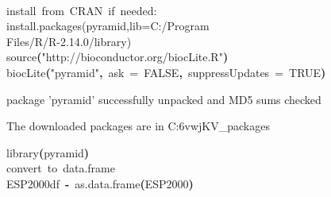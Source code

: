 \documentclass[a4paper]{article}
\newcommand{\hlnumber}[1]{\textcolor[rgb]{0.0823529411764706,0.0784313725490196,0.709803921568627}{#1}}%
\newcommand{\hlfunctioncall}[1]{\textcolor[rgb]{1,0,0}{#1}}%
\newcommand{\hlstring}[1]{\textcolor[rgb]{0.6,0.6,1}{#1}}%
\newcommand{\hlkeyword}[1]{\textcolor[rgb]{0,0,0}{\textbf{#1}}}%
\newcommand{\hlargument}[1]{\textcolor[rgb]{0.694117647058824,0.247058823529412,0.0196078431372549}{#1}}%
\newcommand{\hlcomment}[1]{\textcolor[rgb]{0.8,0.8,0.8}{#1}}%
\newcommand{\hlassignement}[1]{\textcolor[rgb]{0.215686274509804,0.215686274509804,0.384313725490196}{\textbf{#1}}}%
\newcommand{\hlsymbol}[1]{\textcolor[rgb]{0,0,0}{#1}}%
\newcommand{\hlprompt}[1]{\textcolor[rgb]{0,0,0}{#1}}%
\newcommand{\hlstd}[1]{\textcolor[rgb]{0,0,0}{#1}}%
\newenvironment{Houtput}{\raggedright}{%
%
}
\renewenvironment{Schunk}{\vspace{\topsep}}{\vspace{\topsep}}
\begin{document}
\begin{Houtput}
\hspace*{\fill}\\
\hlstd{}\ttfamily\noindent
\hlprompt{\usebox{\hlnormalsizeboxgreaterthan}{\ }}\hlcomment{\usebox{\hlnormalsizeboxhash}{\ }install{\ }from{\ }CRAN{\ }if{\ }needed:}\mbox{}
\normalfont
\hspace*{\fill}\\
\hlstd{}\ttfamily\noindent
\hlprompt{\usebox{\hlnormalsizeboxgreaterthan}{\ }}\hlcomment{\usebox{\hlnormalsizeboxhash}install.packages(\usebox{\hlnormalsizeboxsinglequote}pyramid\usebox{\hlnormalsizeboxsinglequote},lib=\usebox{\hlnormalsizeboxsinglequote}C:/Program}\mbox{}
\normalfont
\hspace*{\fill}\\
\hlstd{}\ttfamily\noindent
\hlprompt{\usebox{\hlnormalsizeboxgreaterthan}{\ }}\hlcomment{\usebox{\hlnormalsizeboxhash}{\ }{\ }{\ }Files/R/R-2.14.0/library\usebox{\hlnormalsizeboxsinglequote})}\mbox{}
\normalfont
\hspace*{\fill}\\
\hlstd{}\ttfamily\noindent
\hlprompt{\usebox{\hlnormalsizeboxgreaterthan}{\ }}\hlfunctioncall{source}\hlkeyword{(}\hlstring{"http://bioconductor.org/biocLite.R"}\hlkeyword{)}\mbox{}
\normalfont
\hspace*{\fill}\\
\hlstd{}\ttfamily\noindent
\hlprompt{\usebox{\hlnormalsizeboxgreaterthan}{\ }}\hlfunctioncall{biocLite}\hlkeyword{(}\hlstring{"pyramid"}\hlkeyword{,}{\ }\hlargument{ask}{\ }\hlargument{=}{\ }\hlnumber{FALSE}\hlkeyword{,}{\ }\hlargument{suppressUpdates}{\ }\hlargument{=}{\ }\hlnumber{TRUE}\hlkeyword{)}\mbox{}
\normalfont
\hspace*{\fill}\\
\hlstd{}\begin{Schunk}
\begin{Soutput}
package 'pyramid' successfully unpacked and MD5 sums checked

The downloaded packages are in
	C:\Users\triffe\AppData\Local\Temp\Rtmp6vwjKV\downloaded_packages
\end{Soutput}
\ttfamily\noindent
\hlprompt{\usebox{\hlnormalsizeboxgreaterthan}{\ }}\hlfunctioncall{library}\hlkeyword{(}\hlsymbol{pyramid}\hlkeyword{)}\mbox{}
\normalfont
\hspace*{\fill}\\
\hlstd{}\ttfamily\noindent
\hlprompt{\usebox{\hlnormalsizeboxgreaterthan}{\ }}\hlcomment{\usebox{\hlnormalsizeboxhash}{\ }convert{\ }to{\ }data.frame}\mbox{}
\normalfont
\hspace*{\fill}\\
\hlstd{}\ttfamily\noindent
\hlprompt{\usebox{\hlnormalsizeboxgreaterthan}{\ }}\hlsymbol{ESP2000df}{\ }\hlassignement{\usebox{\hlnormalsizeboxlessthan}-}{\ }\hlfunctioncall{as.data.frame}\hlkeyword{(}\hlsymbol{ESP2000}\hlkeyword{)}\mbox{}
\normalfont
\hspace*{\fill}\\
\hlstd{}
\end{Schunk}
\end{Houtput}
\end{document}
